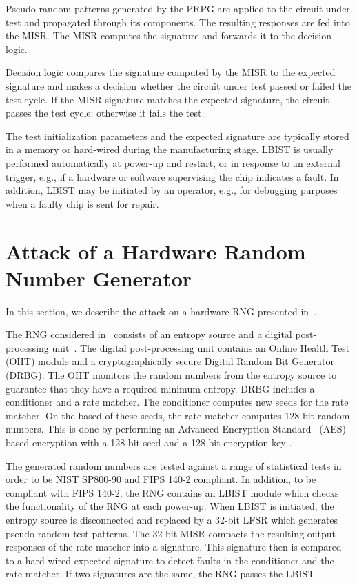 \documentclass[a4paper]{llncs}
\begin{document}
Pseudo-random patterns generated by the PRPG are applied to the circuit under test and propagated through its components. The resulting responses are fed into the MISR. The MISR computes the signature and forwards it to the decision logic.

Decision logic compares the signature computed by the MISR to the expected signature and makes a decision whether the circuit under test passed or failed the test cycle. If the MISR signature matches the expected signature, the circuit passes the test cycle; otherwise it fails the test.  

The test initialization parameters and the expected signature are typically stored in a memory or hard-wired during the manufacturing stage. LBIST is usually performed automatically at power-up and restart, or in response to an external trigger, e.g., if a hardware or software supervising the chip indicates a fault. In addition, LBIST may be initiated by an operator, e.g., for debugging purposes when a faulty chip is sent for repair.


\section{Attack of a Hardware Random Number Generator} \label{intel}

In this section, we describe the attack on a hardware RNG presented in~\cite{BeRPB13}. 

The RNG considered in~\cite{BeRPB13} consists of an entropy source and a digital post-processing unit~\cite{intel}.
The digital post-processing unit contains an Online Health Test (OHT) module and a cryptographically secure Digital Random Bit Generator (DRBG). The OHT monitors the random numbers from the entropy source to guarantee that they have a required minimum entropy. DRBG includes a conditioner and a rate matcher. The conditioner computes new seeds for the rate matcher. On the based of these seeds, the rate matcher computes 128-bit random numbers. This is done  by performing an Advanced Encryption Standard~\cite{aes} (AES)-based encryption with a 128-bit seed  and a 128-bit encryption key . 

The generated random numbers are tested against a range of statistical tests in order to be NIST SP800-90 and FIPS 140-2 compliant.
In addition, to be compliant with FIPS 140-2, the RNG contains an LBIST module which checks the functionality of the RNG at each power-up. When LBIST is initiated, the entropy source is disconnected and replaced by a 32-bit LFSR which generates pseudo-random test patterns. The 32-bit MISR compacts the resulting output responses of the rate matcher into a signature.
This signature then is compared to a hard-wired expected signature to detect faults in the conditioner and the rate matcher. If two signatures are the same, the RNG passes the LBIST.
\end{document}
